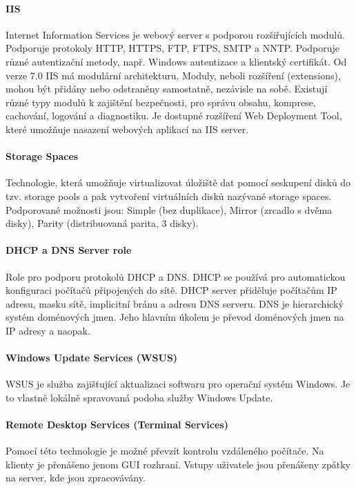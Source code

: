 \paragraph{IIS} 
Internet Information Services je webový server s podporou rozšiřujících modulů. Podporuje protokoly HTTP, HTTPS, FTP, FTPS, SMTP a NNTP. Podporuje různé autentizační metody, např. Windows autentizace a klientský certifikát. Od verze 7.0 IIS má modulární architekturu.  Moduly, neboli rozšíření (extensions), mohou být přidány nebo odstraněny samostatně, nezávisle na sobě.
Existují různé typy modulů k zajištění bezpečnosti, pro správu obsahu, komprese, cachování, logování a diagnostiku. Je dostupné rozšíření Web Deployment Tool, které umožňuje nasazení webových aplikací na IIS server. \cite{MasteringWindowsServer}

\paragraph{Storage Spaces} 
Technologie, která umožňuje virtualizovat úložiště dat pomocí seskupení disků do tzv. storage pools a pak vytvoření virtuálních disků nazývané storage spaces. Podporované možnosti jsou: Simple (bez duplikace), Mirror (zrcadlo s dvěma disky), Parity (distribuovaná parita, 3 disky). \cite{MasteringWindowsServer}

\paragraph{DHCP a DNS Server role} 
Role pro podporu protokolů DHCP a DNS. DHCP se používá pro automatickou konfiguraci počítačů připojených do sítě. DHCP server přiděluje počítačům IP adresu, masku sítě, implicitní bránu a adresu DNS serveru. DNS je hierarchický systém doménových jmen. Jeho hlavním úkolem je převod doménových jmen na IP adresy a naopak. \cite{MasteringWindowsServer}

\paragraph{Windows Update Services (WSUS)} 
WSUS je služba zajišťující aktualizaci softwaru pro operační systém Windows. Je to vlastně lokálně spravovaná podoba služby Windows Update. \cite{MasteringWindowsServer}

\paragraph{Remote Desktop Services (Terminal Services)} 
Pomocí této technologie je možné převzít kontrolu vzdáleného počítače. Na klienty je přenášeno jenom GUI rozhraní. Vstupy uživatele jsou přenášeny zpátky na server, kde jsou zpracovávány. \cite{MasteringWindowsServer}

